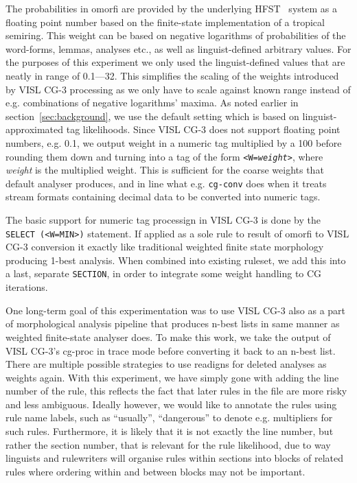 \documentclass[11pt]{article}
\begin{document}
The probabilities in omorfi are provided by the underlying HFST~\cite{hfst}
system as a floating point number based on the finite-state implementation of a
tropical semiring.  This weight can be based on negative logarithms of
probabilities of the word-forms, lemmas, analyses etc., as well as
linguist-defined arbitrary values. For the purposes of this experiment we only
used the linguist-defined values that are neatly in range of 0.1---32. This
simplifies the scaling of the weights introduced by VISL CG-3 processing as we
only have to scale against known range instead of e.g.  combinations of
negative logarithms' maxima. As noted earlier in section~\ref{sec:background},
we use the default setting which is based on linguist-approximated tag
likelihoods. Since VISL CG-3 does
not support floating point numbers, e.g. 0.1, we output weight in a
numeric tag multiplied by a 100 before rounding them down and turning 
into a tag of the form \texttt{<W=\emph{weight}>}, where
\emph{weight} is the multiplied weight. This is sufficient for the
coarse weights that default analyser produces, and in line what e.g. 
\texttt{cg-conv} does when it treats stream formats containing decimal data
to be converted into numeric tags.

The basic support for numeric tag processign in VISL CG-3 is done by the
\texttt{SELECT (<W=MIN>)} statement. If applied as a sole rule to result of
omorfi to VISL CG-3 conversion it exactly like traditional weighted finite
state morphology producing 1-best analysis. When combined into existing
ruleset, we add this into a last, separate \texttt{SECTION}, in order to
integrate some weight handling to CG iterations.

One long-term goal of this experimentation was to use VISL CG-3 also as a
part of morphological analysis pipeline that produces n-best lists in same
manner as weighted finite-state analyser does. To make this work, we take
the output of VISL CG-3's cg-proc in trace mode before converting it back
to an n-best list. There are multiple possible strategies to use readigns
for deleted analyses as weights again. With this experiment, we have simply
gone with adding the line number of the rule, this reflects the fact that
later rules in the file are more risky and less ambiguous. Ideally however,
we would like to annotate the rules using rule name labels, such as
``usually'', ``dangerous'' to denote e.g. multipliers for such rules. Furthermore,
it is likely that it is not exactly the line number, but rather the section
number, that is relevant for the rule likelihood, due to way linguists and
rulewriters will organise rules within sections into blocks of related rules
where ordering within and between blocks may not be important.
\end{document}
